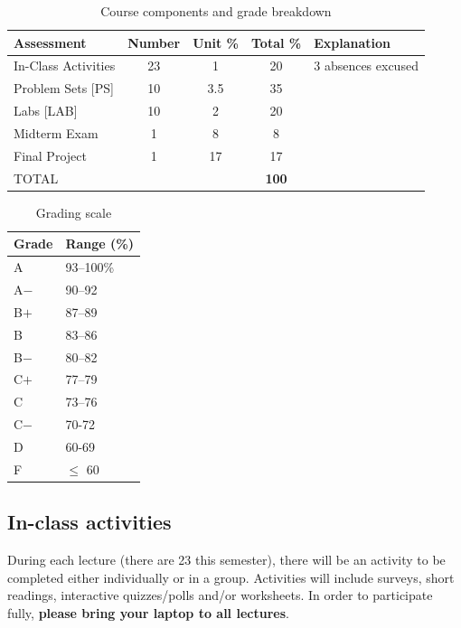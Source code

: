 \documentclass[11pt,twoside]{article}
\numberwithin{equation}{section}
\newcommand{\?}{\stackrel{?}{=}}
\begin{document}
\begin{table}[h!]
  \centering
  \caption{Course components and grade breakdown}
  \label{tab:comp}  
  \begin{tabular}{l c c c l}\toprule
    \bf Assessment & \bf Number & \bf Unit \% & \bf Total \%  & \bf Explanation\\ \midrule
    In-Class Activities  & 23 & 1 & 20 & 3 absences excused \\
    Problem Sets [PS] & 10 & 3.5 & 35 &\\
    Labs [LAB] & 10 & 2 & 20 &  \\
    Midterm Exam         & 1 & 8 & 8 &\\
    Final Project   & 1 & 17 & 17 & \\ \midrule
    TOTAL & & & \bf 100 & \\
    \bottomrule
  \end{tabular}
\end{table}

\begin{table}[h!]
   \centering
 \caption{Grading scale}
 \label{tab:scale}
   \begin{tabular}{l l}\toprule
   Grade & Range (\%) \\\midrule
   A & 93--100\%   \\
   A$-$ & 90--92 \\
   B$+$ & 87--89 \\
   B &   83--86 \\
   B$-$ & 80--82 \\
   C$+$  & 77--79\\
   C   & 73--76 \\
   C$-$ & 70-72 \\
   D & 60-69 \\
   F &  $\le$ 60\\\bottomrule
 \end{tabular}
\end{table}

\subsection{In-class activities}
During each lecture (there are 23 this semester), there will be an activity to be completed either individually or in a group. Activities will include surveys, short readings, interactive quizzes/polls and/or worksheets.
In order to participate fully, \textbf{please bring your laptop to all lectures}.
\end{document}
